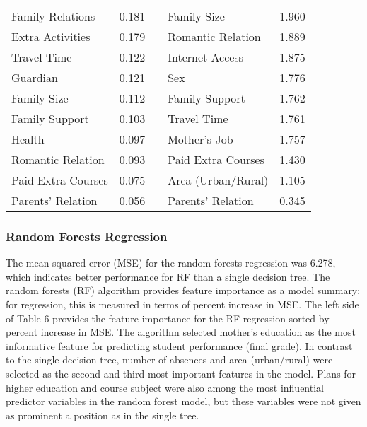 \documentclass[sigconf]{acmart}
\begin{document}
\begin{table*}
\begin{tabular}{lllll}
    Family Relations    &  0.181 &   &      Family Size	        &   1.960   \\
    Extra Activities    &  0.179 &   &      Romantic Relation	&   1.889   \\
    Travel Time         &  0.122 &   &      Internet Access     &   1.875   \\ 
    Guardian            &  0.121 &   &      Sex	        	    &   1.776	\\
    Family Size         &  0.112 &   &      Family Support 	    &   1.762	\\
    Family Support      &  0.103 &   &      Travel Time	        &   1.761   \\
    Health              &  0.097 &   &      Mother's Job    	&   1.757	\\ 
    Romantic Relation   &  0.093 &   &      Paid Extra Courses  &   1.430   \\
    Paid Extra Courses  &  0.075 &   &      Area (Urban/Rural)	&   1.105	\\
    Parents' Relation   &  0.056 &   &      Parents' Relation   &   0.345   \\
    \bottomrule
  \end{tabular}	
\end{table*}
	
	

\subsubsection{Random Forests Regression}

The mean squared error (MSE) for the random forests regression was 6.278, 
which indicates better performance for RF than a single decision tree. The 
random forests (RF) algorithm provides feature importance as a model summary; 
for regression, this is measured in terms of percent increase in MSE. The left 
side of Table 6 provides the feature importance for the RF regression sorted 
by percent increase in MSE. The algorithm selected mother's education as the 
most informative feature for predicting student performance (final grade). In 
contrast to the single decision tree, number of absences and area (urban/rural)
were selected as the second and third most important features in the model. 
Plans for higher education and course subject were also among the most 
influential predictor variables in the random forest model, but these
variables were not given as prominent a position as in the single tree. 
\end{document}

